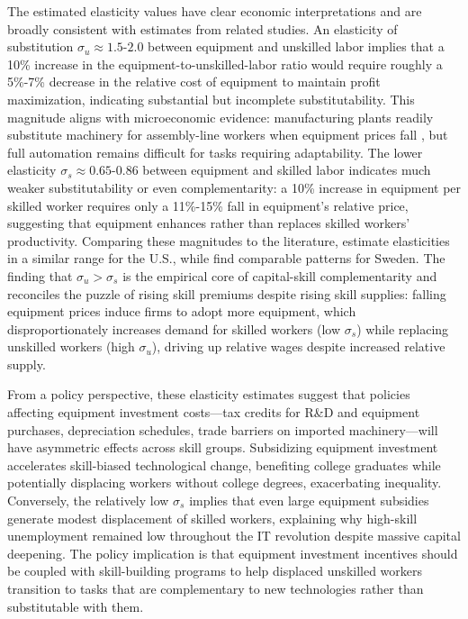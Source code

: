 \documentclass[12pt]{article}
\begin{document}
The estimated elasticity values have clear economic interpretations and are broadly consistent with estimates from related studies. An elasticity of substitution $\sigma_u \approx 1.5$-$2.0$ between equipment and unskilled labor implies that a 10\% increase in the equipment-to-unskilled-labor ratio would require roughly a 5\%-7\% decrease in the relative cost of equipment to maintain profit maximization, indicating substantial but incomplete substitutability. This magnitude aligns with microeconomic evidence: manufacturing plants readily substitute machinery for assembly-line workers when equipment prices fall \citep{acemoglu2011skills}, but full automation remains difficult for tasks requiring adaptability. The lower elasticity $\sigma_s \approx 0.65$-$0.86$ between equipment and skilled labor indicates much weaker substitutability or even complementarity: a 10\% increase in equipment per skilled worker requires only a 11\%-15\% fall in equipment's relative price, suggesting that equipment enhances rather than replaces skilled workers' productivity. Comparing these magnitudes to the literature, \citet{krusell2000capital} estimate elasticities in a similar range for the U.S., while \citet{lindquist2005capital} find comparable patterns for Sweden. The finding that $\sigma_u > \sigma_s$ is the empirical core of capital-skill complementarity and reconciles the puzzle of rising skill premiums despite rising skill supplies: falling equipment prices induce firms to adopt more equipment, which disproportionately increases demand for skilled workers (low $\sigma_s$) while replacing unskilled workers (high $\sigma_u$), driving up relative wages despite increased relative supply.

From a policy perspective, these elasticity estimates suggest that policies affecting equipment investment costs---tax credits for R\&D and equipment purchases, depreciation schedules, trade barriers on imported machinery---will have asymmetric effects across skill groups. Subsidizing equipment investment accelerates skill-biased technological change, benefiting college graduates while potentially displacing workers without college degrees, exacerbating inequality. Conversely, the relatively low $\sigma_s$ implies that even large equipment subsidies generate modest displacement of skilled workers, explaining why high-skill unemployment remained low throughout the IT revolution despite massive capital deepening. The policy implication is that equipment investment incentives should be coupled with skill-building programs to help displaced unskilled workers transition to tasks that are complementary to new technologies rather than substitutable with them.
\end{document}
